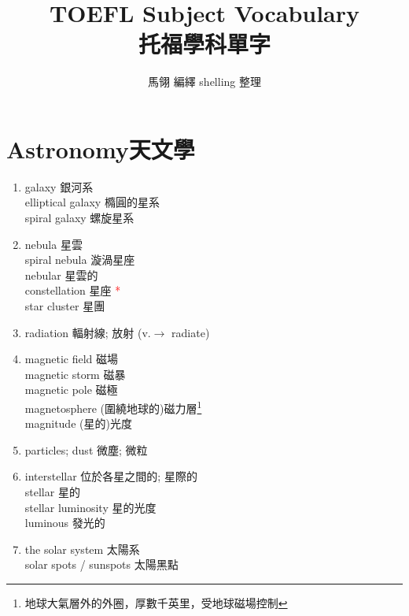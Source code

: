 \documentclass[twoside,b5paper]{book}
\begin{document}
  \title{TOEFL Subject Vocabulary\\ 托福學科單字}
  \author{馬翎 編繹 shelling 整理}
  \maketitle

  \tableofcontents %

  \chapter{Astronomy天文學}
  \begin{enumerate}
    \item
      galaxy  銀河系\\
      elliptical galaxy 橢圓的星系\\
      spiral galaxy 螺旋星系
    \item
      nebula  星雲\\
      spiral nebula 漩渦星座\\
      nebular 星雲的\\
      constellation  星座 \textcolor{red}{*}\\
      star cluster 星團
    \item
      radiation 輻射線; 放射 (v.$\to$ radiate)
    \item
      magnetic field 磁場\\
      magnetic storm 磁暴\\
      magnetic pole 磁極\\
      magnetosphere (圍繞地球的)磁力層\footnote{地球大氣層外的外圈，厚數千英里，受地球磁場控制}\\
      magnitude (星的)光度
    \item
      particles; dust 微塵; 微粒
    \item
      interstellar  位於各星之間的; 星際的\\
      stellar  星的\\
      stellar luminosity  星的光度\\
      luminous  發光的
    \item
      the solar system 太陽系\\
      solar spots / sunspots 太陽黑點\\

\end{enumerate}
\end{document}
